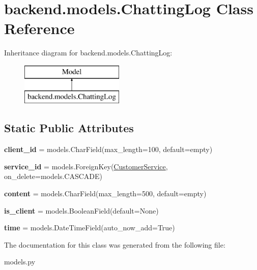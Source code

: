 \hypertarget{classbackend_1_1models_1_1_chatting_log}{}\section{backend.\+models.\+Chatting\+Log Class Reference}
\label{classbackend_1_1models_1_1_chatting_log}
Inheritance diagram for backend.\+models.\+Chatting\+Log\+:\begin{figure}[H]
\begin{center}
\leavevmode
\includegraphics[height=2.000000cm]{classbackend_1_1models_1_1_chatting_log}
\end{center}
\end{figure}
\subsection*{Static Public Attributes}
\begin{DoxyCompactItemize}
\item 
\mbox{\label{classbackend_1_1models_1_1_chatting_log_ad4a2575c5ddea616091c56a533260057}} 
{\bfseries client\+\_\+id} = models.\+Char\+Field(max\+\_\+length=100, default=\textquotesingle{}empty\textquotesingle{})
\item 
\mbox{\label{classbackend_1_1models_1_1_chatting_log_a4caf40e3ed8a77c14bed06e84a29a545}} 
{\bfseries service\+\_\+id} = models.\+Foreign\+Key(\textquotesingle{}\hyperlink{classbackend_1_1models_1_1_customer_service}{Customer\+Service}\textquotesingle{}, on\+\_\+delete=models.\+C\+A\+S\+C\+A\+DE)
\item 
\mbox{\label{classbackend_1_1models_1_1_chatting_log_a949ca36a46572fe7420dcfbd4c8405be}} 
{\bfseries content} = models.\+Char\+Field(max\+\_\+length=500, default=\textquotesingle{}empty\textquotesingle{})
\item 
\mbox{\label{classbackend_1_1models_1_1_chatting_log_a9a9117e248f68e05aa590f8b0da8b9b9}} 
{\bfseries is\+\_\+client} = models.\+Boolean\+Field(default=None)
\item 
\mbox{\label{classbackend_1_1models_1_1_chatting_log_ac521f6b7be439909cda170d4dbe5576b}} 
{\bfseries time} = models.\+Date\+Time\+Field(auto\+\_\+now\+\_\+add=True)
\end{DoxyCompactItemize}


The documentation for this class was generated from the following file\+:\begin{DoxyCompactItemize}
\item 
models.\+py\end{DoxyCompactItemize}
